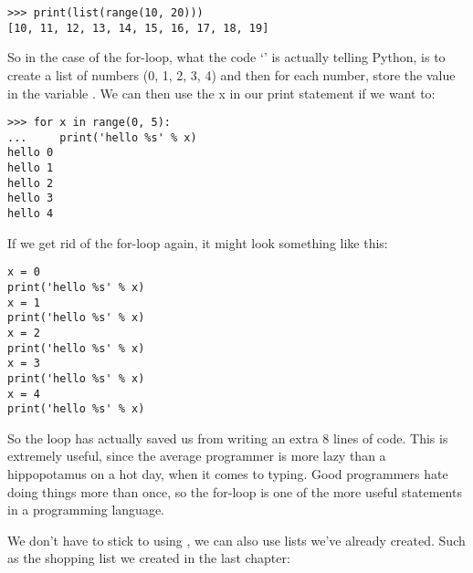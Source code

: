 \begin{listing}
\begin{verbatim}
>>> print(list(range(10, 20)))
[10, 11, 12, 13, 14, 15, 16, 17, 18, 19]
\end{verbatim}
\end{listing}

So in the case of the for-loop, what the code `' is actually telling Python, is to create a list of numbers (0, 1, 2, 3, 4) and then for each number, store the value in the variable . We can then use the x in our print statement if we want to:

\begin{listing}
\begin{verbatim}
>>> for x in range(0, 5):
...     print('hello %s' % x)
hello 0
hello 1
hello 2
hello 3
hello 4
\end{verbatim}
\end{listing}

If we get rid of the for-loop again, it might look something like this:

\begin{listing}
\begin{verbatim}
x = 0
print('hello %s' % x)
x = 1
print('hello %s' % x)
x = 2
print('hello %s' % x)
x = 3
print('hello %s' % x)
x = 4
print('hello %s' % x)
\end{verbatim}
\end{listing}

So the loop has actually saved us from writing an extra 8 lines of code.  This is extremely useful, since the average programmer is more lazy than a hippopotamus on a hot day, when it comes to typing. Good programmers hate doing things more than once, so the for-loop is one of the more useful statements in a programming language.

\linebreak
\par
We don't have to stick to using , we can also use lists we've already created.  Such as the shopping list we created in the last chapter:


